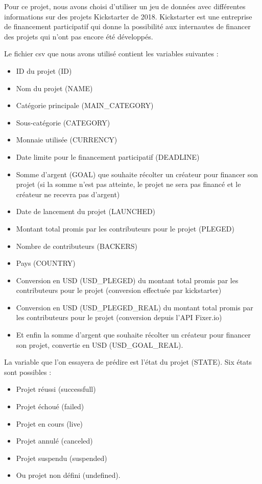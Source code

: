 \documentclass{article}
\begin{document}
Pour ce projet, nous avons choisi d'utiliser un jeu de données avec différentes informations sur des projets Kickstarter de 2018. Kickstarter est une entreprise de financement participatif qui donne la possibilité aux internautes de financer des projets qui n'ont pas encore été développés.\newline 

\noindent Le fichier csv que nous avons utilisé contient les variables suivantes : \newline 
\begin{itemize}
    \item ID du projet (ID)
    \item Nom du projet (NAME)
    \item Catégorie principale (MAIN\_CATEGORY)
    \item Sous-catégorie (CATEGORY)
    \item Monnaie utilisée (CURRENCY)
    \item Date limite pour le financement participatif (DEADLINE)
    \item Somme d'argent (GOAL) que souhaite récolter un créateur pour financer son projet (si la somme n'est pas atteinte, le projet ne sera pas financé et le créateur ne recevra pas d'argent)
    \item Date de lancement du projet (LAUNCHED)
    \item Montant total promis par les contributeurs pour le projet (PLEGED)
    \item Nombre de contributeurs (BACKERS)
    \item Pays (COUNTRY)
    \item Conversion en USD (USD\_PLEGED) du montant total promis par les contributeurs pour le projet (conversion effectuée par kickstarter) 
    \item Conversion en USD (USD\_PLEGED\_REAL) du montant total promis par les contributeurs pour le projet (conversion depuis l'API Fixer.io)
    \item Et enfin la somme d'argent que souhaite récolter un créateur pour financer son projet, convertie en USD (USD\_GOAL\_REAL).\newline 

\end{itemize}

\noindent La variable que l'on essayera de prédire est l'état du projet (STATE). Six états sont possibles :

\begin{itemize}
    \item Projet réussi (successfull)
    \item Projet échoué (failed)
    \item Projet en cours (live)
    \item Projet annulé (canceled)
    \item Projet suspendu (suspended)
    \item Ou projet non défini (undefined).\newline 
\end{itemize}
\end{document}
